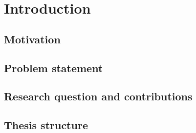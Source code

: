 \chapter{Introduction} \label{ch:introduction}

\section{Motivation} \label{sec:motivation}

\section{Problem statement} \label{sec:problem-statement}

\section{Research question and contributions} \label{sec:research-question}

\section{Thesis structure} \label{sec:thesis-structure}

